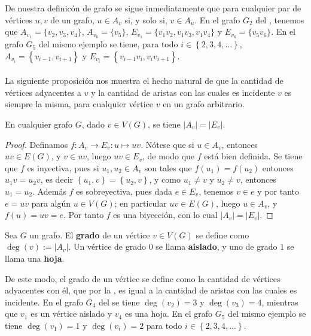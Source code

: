 De nuestra definicón de grafo se sigue inmediatamente que para cualquier par de vértices $u,v$ de un grafo, $u\in A_v$ si, y solo si, $v\in A_u$. En el grafo $G_2$ del , tenemos que $A_{v_1}=\lbrace v_2,v_3,v_4\rbrace$, $A_{v_6}=\lbrace v_5\rbrace$, $E_{v_1}=\lbrace v_1v_2,v_1v_3,v_1v_4 \rbrace$ y $E_{v_6}=\lbrace v_5v_6\rbrace$. En el grafo $G_5$ del mismo ejemplo se tiene, para todo $i\in \left\lbrace 2,3,4,\dots\right\rbrace$, $A_{v_i}=\left\lbrace v_{i-1}, v_{i+1}\right\rbrace$ y $E_{v_i}=\left\lbrace v_{i-1}v_i, v_iv_{i+1}\right\rbrace$.\\\\
La siguiente proposición nos muestra el hecho natural de que la cantidad de vértices adyacentes a $v$ y la cantidad de aristas con las cuales es incidente $v$ es siempre la misma, para cualquier vértice $v$ en un grafo arbitrario.
\begin{Prop} \label{Prop:AvEv}
   En cualquier grafo $G$, dado $v\in V(G)$, se tiene $|A_v|=|E_v|$.
\end{Prop}
\begin{proof}
Definamos $f:A_v\to E_v: u\mapsto uv$. Nótese que si $u\in A_v$, entonces $uv\in E(G)$, y $v\in uv$, luego $uv\in E_v$, de modo que $f$ está bien definida. Se tiene que $f$ es inyectiva, pues si $u_1,u_2 \in A_v$ son tales que $f(u_1)=f(u_2)$ entonces $u_1v=u_2v$, es decir $\left\lbrace u_1,v\right\rbrace=\left\lbrace u_2,v\right\rbrace$, y como $u_1\neq v$ y $u_2\neq v$, entonces $u_1=u_2$. Además $f$ es sobreyectiva, pues dada $e\in E_v$, tenemos $v\in e$ y por tanto $e=uv$ para algún $u\in V(G)$; en particular $uv\in E(G)$, luego $u\in A_v$, y $f(u)=uv=e$. Por tanto $f$ es una biyección, con lo cual $|A_v|=|E_v|$.
\end{proof}
\begin{Def}
   Sea $G$ un grafo. El \textbf{grado} de un vértice $v\in V(G)$ se define como $\operatorname{deg}(v):=|A_v|$. Un vértice de grado $0$ se llama \textbf{aislado}, y uno de grado $1$ se llama una \textbf{hoja}.
\end{Def}
De este modo, el grado de un vértice se define como la cantidad de vértices adyacentes con él, que por la , es igual a la cantidad de aristas con las cuales es incidente. En el grafo $G_4$ del  se tiene $\operatorname{deg}(v_2)=3$ y $\operatorname{deg}(v_3)=4$, mientras que $v_1$ es un vértice aislado y $v_4$ es una hoja. En el grafo $G_5$ del mismo ejemplo se tiene $\operatorname{deg}(v_1)=1$ y $\operatorname{deg}(v_i)=2$ para todo $i\in \left\lbrace 2,3,4,\dots \right\rbrace$.
